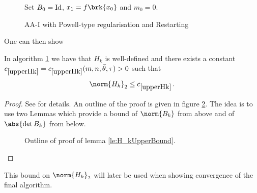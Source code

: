 \begin{figure}[h]
\centering
\begin{algorithm}[H]
\caption{AA-I with Powell-type regularisation and Restarting}\label{alg:aa1-pr}

\BlankLine
Set $B_0=\operatorname{Id}$, $x_1=f\brk{x_0}$ and {\black $m_0 = 0$}.

\end{algorithm}
\end{figure}

One can then show
\begin{lemma}\label{le:H_kUpperBound}
	In algorithm \ref{alg:aa1-pr} we have that $H_k$ is well-defined and there exists a constant $\useconstant{upperHk}=\useconstant{upperHk}(m,n, \bartheta,\tau)>0$ such that
	\begin{align*}
		\norm{H_k}_2\leq \useconstant{upperHk}\,.
	\end{align*}
\end{lemma}
\begin{proof}
	See \cite[Corollary 4]{ZhaAA} for details. An outline of the proof is given in figure \ref{fig:Diagram_001}. The idea is to use two Lemmas which provide a bound of $\norm{B_k}$ from above and of $\abs{\det B_k}$ from below.
	
	\begin{figure}
	\centering
	\scalebox{0.7}{{\normalsize
	
	}}
	\caption{Outline of proof of lemma \ref{le:H_kUpperBound}.}
	\label{fig:Diagram_001}
	\end{figure}
\end{proof}
This bound on $\norm{H_k}_2$ will later be used when showing convergence of the final algorithm.


